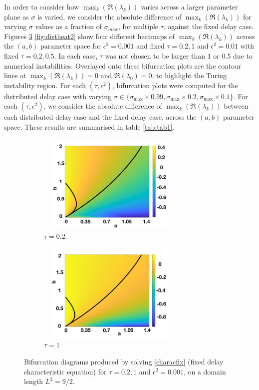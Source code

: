 In order to consider how $\max_k(\Re(\lambda_k))$ varies across a larger parameter plane as $\sigma$ is varied, we consider the absolute difference of $\max_k(\Re(\lambda_k))$ for varying $\sigma$ values as a fraction of $\sigma_{max}$, for multiple $\tau$, against the fixed delay case. Figures \ref{fig:distheat1} \ref{fig:distheat2} show four different heatmaps of $\max_k(\Re(\lambda_k))$ across the $(a,b)$ parameter space for $\epsilon^2=0.001$ and fixed $\tau=0.2,1$ and $\epsilon^2=0.01$ with fixed $\tau=0.2,0.5$. In each case, $\tau$ was not chosen to be larger than $1$ or $0.5$ due to numerical instabilities. Overlayed onto these bifurcation plots are the contour lines at $\max_k(\Re(\lambda_k))=0$ and $\Re(\lambda_0)=0$, to highlight the Turing instability region. For each $(\tau,\epsilon^2)$, bifurcation plots were computed for the distributed delay case with varying $\sigma\in\{\sigma_{\max}\times0.99,\sigma_{\max}\times0.2,\sigma_{\max}\times0.1\}$. For each $(\tau,\epsilon^2)$, we consider the absolute difference of $\max_k(\Re(\lambda_k))$ between each distributed delay case and the fixed delay case, across the $(a,b)$ parameter space. These results are summarised in table \ref{tab:tab1}.
\begin{figure}[H]
    \centering
    \begin{subfigure}[t]{0.45\textwidth}
        \centering
        \includegraphics[width=7cm,height=4.75cm]{t1f1.png}
        \caption{$\tau=0.2$.}
        \label{}
    \end{subfigure}
    \hfill
    \begin{subfigure}[t]{0.45\textwidth}
        \centering
        \includegraphics[width=7cm,height=4.75cm]{t2f1.png}
        \caption{$\tau=1$}
        \label{}
    \end{subfigure}
    \caption{Bifurcation diagrams produced by solving \eqref{characfix} (fixed delay characteristic equation) for $\tau=0.2,1$ and $\epsilon^2=0.001$, on a domain length $L^2=9/2$.}
    \label{fig:distheat1}
\end{figure}
